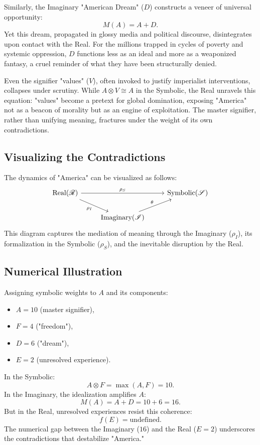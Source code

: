 \documentclass{article}
\begin{document}
Similarly, the Imaginary "American Dream" ($D$) constructs a veneer of universal opportunity:
\[
M(A) = A + D.
\]
Yet this dream, propagated in glossy media and political discourse, disintegrates upon contact with the Real. For the millions trapped in cycles of poverty and systemic oppression, $D$ functions less as an ideal and more as a weaponized fantasy, a cruel reminder of what they have been structurally denied.

Even the signifier "values" ($V$), often invoked to justify imperialist interventions, collapses under scrutiny. While $A \otimes V \cong A$ in the Symbolic, the Real unravels this equation: "values" become a pretext for global domination, exposing "America" not as a beacon of morality but as an engine of exploitation. The master signifier, rather than unifying meaning, fractures under the weight of its own contradictions.

\subsection{Visualizing the Contradictions}

The dynamics of "America" can be visualized as follows:
\[
\begin{tikzcd}
\text{Real} (\mathscr{R}) \arrow[rr, "\rho_S"] \arrow[dr, "\rho_I"'] & & \text{Symbolic} (\mathscr{S}) \\
& \text{Imaginary} (\mathscr{I}) \arrow[ur, "\theta"]
\end{tikzcd}
\]
This diagram captures the mediation of meaning through the Imaginary ($\rho_I$), its formalization in the Symbolic ($\rho_S$), and the inevitable disruption by the Real.

\subsection{Numerical Illustration}

Assigning symbolic weights to $A$ and its components:
\begin{itemize}
    \item $A = 10$ (master signifier),
    \item $F = 4$ ("freedom"),
    \item $D = 6$ ("dream"),
    \item $E = 2$ (unresolved experience).
\end{itemize}
In the Symbolic:
\[
A \otimes F = \max(A, F) = 10.
\]
In the Imaginary, the idealization amplifies $A$:
\[
M(A) = A + D = 10 + 6 = 16.
\]
But in the Real, unresolved experiences resist this coherence:
\[
f(E) = \text{undefined}.
\]
The numerical gap between the Imaginary ($16$) and the Real ($E = 2$) underscores the contradictions that destabilize "America."
\end{document}
